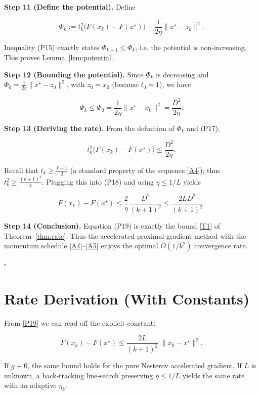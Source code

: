 \documentclass{article}
\begin{document}
\bigskip
\noindent\textbf{Step 11 (Define the potential).}  
Define  

\[
\Phi_{k}:=t_{k}^{2}\bigl(F(x_{k})-F(x^{\star})\bigr)
+\frac{1}{2\eta}\|x^{\star}-z_{k}\|^{2}.
\tag{P16}
\]

Inequality (P15) exactly states $\Phi_{k+1}\le\Phi_{k}$, i.e. the potential is
non‑increasing. This proves Lemma~\ref{lem:potential}.

\bigskip
\noindent\textbf{Step 12 (Bounding the potential).}  
Since $\Phi_{k}$ is decreasing and $\Phi_{0}= \frac{1}{2\eta}\|x^{\star}-z_{0}\|^{2}$,
with $z_{0}=x_{0}$ (because $t_{0}=1$), we have  

\[
\Phi_{k}\le\Phi_{0}= \frac{1}{2\eta}\|x^{\star}-x_{0}\|^{2}= \frac{D^{2}}{2\eta}.
\tag{P17}
\]

\bigskip
\noindent\textbf{Step 13 (Deriving the rate).}  
From the definition of $\Phi_{k}$ and (P17),

\[
t_{k}^{2}\bigl(F(x_{k})-F(x^{\star})\bigr)
\le \frac{D^{2}}{2\eta}.
\tag{P18}
\]

Recall that $t_{k}\ge \frac{k+1}{2}$ (a standard property of the sequence
\eqref{A4}); thus $t_{k}^{2}\ge \frac{(k+1)^{2}}{4}$. Plugging this into (P18)
and using $\eta\le 1/L$ yields

\[
F(x_{k})-F(x^{\star})\le \frac{2}{\eta}\,\frac{D^{2}}{(k+1)^{2}}
\le \frac{2L D^{2}}{(k+1)^{2}} .
\tag{P19}
\]

\noindent\textbf{Step 14 (Conclusion).}  
Equation (P19) is exactly the bound \eqref{T1} of Theorem~\ref{thm:rate}.  
Thus the accelerated proximal gradient method with the momentum schedule
\eqref{A4}–\eqref{A5} enjoys the optimal $O(1/k^{2})$ convergence rate.

\hfill $\square$

\section*{Rate Derivation (With Constants)}
From \eqref{P19} we can read off the explicit constant:

\[
\boxed{
F(x_{k})-F(x^{\star})\le \frac{2L}{(k+1)^{2}}\;\|x_{0}-x^{\star}\|^{2}.
}
\]

If $g\equiv0$, the same bound holds for the pure Nesterov accelerated gradient.
If $L$ is unknown, a back‑tracking line‑search preserving $\eta\le 1/L$ yields the
same rate with an adaptive $\eta_{k}$.

\end{document}
